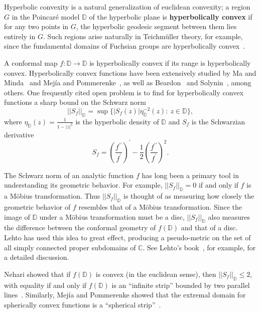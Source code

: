 \documentclass{lms}
\newcommand{\C}{\mathbb C}
\newcommand{\D}{\mathbb D}
\newcommand{\abs}[1]{\lvert#1\rvert}
\newcommand{\norm}[1]{\lvert\lvert#1\rvert\rvert}
\numberwithin{equation}{section}
\begin{document}
Hyperbolic convexity is a natural generalization of euclidean
convexity; a region $G$ in the Poincar\'e model $\D$ of the hyperbolic
plane  is  \textbf{hyperbolically convex} if for any
two points in $G$, the hyperbolic geodesic segment between them lies entirely 
in $G$.  Such regions arise naturally  in Teichm\"uller theory, for example, since
the fundamental domains of Fuchsian groups are hyperbolically convex~\cite{aB83,
oL87}.

A conformal map $f:\D\to\D$ is hyperbolically convex if
its range is hyperbolically convex.
Hyperbolically convex functions have been extensively studied  by Ma and 
Minda~\cite{MM94,MM99} and Mej\'ia and Pommerenke~\cite{PM00,MP00,MP01,MP02,MP00b},
as well as Beardon~\cite{aB83} and Solynin~\cite{aS99,aS98}, 
 among
others.  One frequently cited open problem is to find 
for hyperbolically convex functions a sharp bound
on the Schwarz norm 
\[
\norm{S_f}_\D=\sup\{\abs{S_f(z)} \eta_\D^{-2}(z):\: z\in \D\},
\]
where $\eta_\D(z)=\frac{1}{1-\abs{z}^2}$
 is the hyperbolic density of $\D$ and $S_f$ is the Schwarzian derivative
\[
S_f = \left(\frac{f^{\prime\prime}}{f^\prime}\right)^\prime - 
\frac{1}{2}\left(\frac{f^{\prime\prime}}{f^\prime}\right)^2.
\]


The Schwarz norm
of an analytic function $f$ has long been a primary tool in understanding
its geometric behavior.  
For example, 
$\norm{S_f}_\D =0$ if and only if $f$ is a M\"obius transformation.
Thus $\norm{S_f}_\D$ is thought of as measuring how closely the geometric
behavior of $f$ resembles that of a M\"obius transformation.
Since the image of $\D$ under a M\"obius transformation must be a disc,
$\norm{S_f}_\D$ also measures the difference between the conformal geometry
of $f(\D)$ and that of a disc.  Lehto has used this idea to great effect,
producing a pseudo-metric on the set of all simply connected proper 
subdomains of $\C$.
See Lehto's book~\cite{oL87}, for example, for
a detailed discussion.  

 Nehari showed that if $f(\D)$ is convex (in the euclidean sense),
then $\norm{S_f}_\D\leq 2$, with equality if and only if $f(\D)$ is an 
``infinite strip'' bounded by two parallel lines~\cite{zN76}.
Similarly, Mej\'ia and Pommerenke showed that the extremal domain for spherically
convex functions is a ``spherical strip''~\cite{MP00b}.
\end{document}
